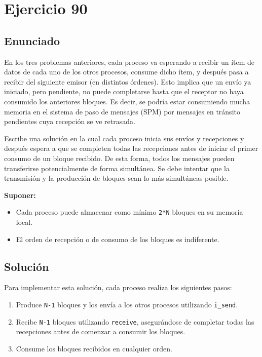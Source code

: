 \documentclass[a4paper,12pt]{article}
\begin{document}
\section{Ejercicio 90}

\subsection{Enunciado}

En los tres problemas anteriores, cada proceso va esperando a recibir un ítem de datos de cada uno de los otros procesos, consume dicho ítem, y después pasa a recibir del siguiente emisor (en distintos órdenes). Esto implica que un envío ya iniciado, pero pendiente, no puede completarse hasta que el receptor no haya consumido los anteriores bloques. Es decir, se podría estar consumiendo mucha memoria en el sistema de paso de mensajes (SPM) por mensajes en tránsito pendientes cuya recepción se ve retrasada.

Escribe una solución en la cual cada proceso inicia sus envíos y recepciones y después espera a que se completen todas las recepciones antes de iniciar el primer consumo de un bloque recibido. De esta forma, todos los mensajes pueden transferirse potencialmente de forma simultánea. Se debe intentar que la transmisión y la producción de bloques sean lo más simultáneas posible.

\textbf{Suponer:} 
\begin{itemize}
    \item Cada proceso puede almacenar como mínimo \texttt{2*N} bloques en su memoria local.
    \item El orden de recepción o de consumo de los bloques es indiferente.
\end{itemize}

\subsection{Solución}

Para implementar esta solución, cada proceso realiza los siguientes pasos:
\begin{enumerate}
  \item Produce \texttt{N-1} bloques y los envía a los otros procesos utilizando \texttt{i\_send}.
  \item Recibe \texttt{N-1} bloques utilizando \texttt{receive}, asegurándose de completar todas las recepciones antes de comenzar a consumir los bloques.
  \item Consume los bloques recibidos en cualquier orden.
\end{enumerate}
\end{document}
